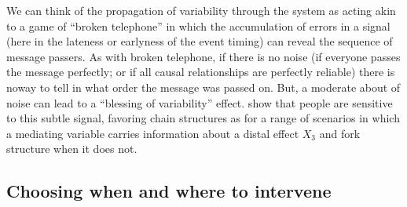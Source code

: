 \documentclass{cambridge7A}%
\begin{document}
We can think of the propagation of variability through the system as acting akin to a game of ``broken telephone'' in which the accumulation of errors in a signal (here in the lateness or earlyness of the event timing) can reveal the sequence of message passers.  As with broken telephone, if there is no noise (if everyone passes the message perfectly; or if all causal relationships are perfectly reliable) there is noway to tell in what order the message was passed on. But, a moderate about of noise can lead to a ``blessing of variability'' effect.   \cite{bramley2018time} show that people are sensitive to this subtle signal, favoring chain structures as for a range of scenarios in which a mediating variable carries information about a distal effect $X_3$ and fork structure when it does not.%





\subsection{Choosing when and where to intervene}
\end{document}

